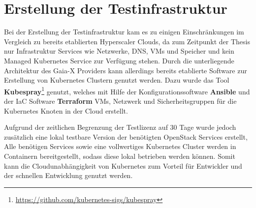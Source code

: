 \section{Erstellung der Testinfrastruktur}
\label{sec:gaia-x-einbettung:erstellung-testinfra}
Bei der Erstellung der Testinfrastruktur kam es zu einigen Einschränkungen im Vergleich zu bereits etablierten Hyperscaler Clouds,
da zum Zeitpunkt der Thesis nur Infrastruktur Services wie Netzwerke, DNS, \acp{VM} und Speicher
und kein Managed Kubernetes Service zur Verfügung stehen.
Durch die unterliegende Architektur des Gaia-X Providers kann allerdings bereits etablierte Software
zur Erstellung von Kubernetes Clustern genutzt werden.
Dazu wurde das Tool \textbf{Kubespray}\footnote{\url{https://github.com/kubernetes-sigs/kubespray}} genutzt,
welches mit Hilfe der Konfigurationssoftware \textbf{Ansible} und der \ac{IaC} Software \textbf{Terraform}
\acp{VM}, Netzwerk und Sicherheitsgruppen für die Kubernetes Knoten in der Cloud erstellt.

Aufgrund der zeitlichen Begrenzung der Testlizenz auf 30 Tage wurde jedoch zusätzlich eine lokal
testbare Version der benötigten OpenStack Services erstellt, 
Alle benötigen Services sowie eine vollwertiges Kubernetes Cluster werden in Containern bereitgestellt,
sodass diese lokal betrieben werden können.
Somit kann die Cloudunabhängigkeit von Kubernetes zum Vorteil für Entwickler und der schnellen Entwicklung genutzt werden.